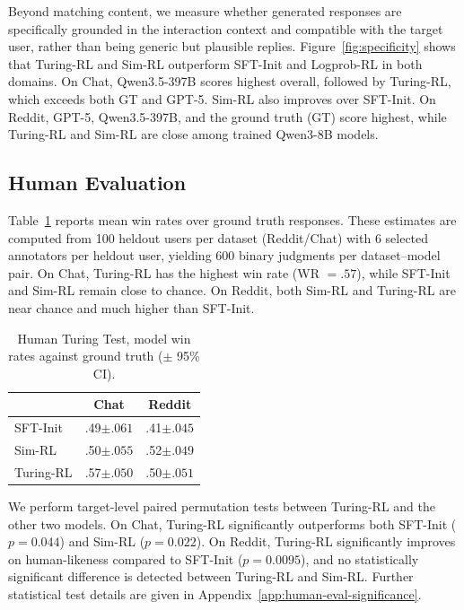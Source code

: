 \documentclass[11pt]{article}
\newcommand{\subtle}[1]{{\tiny\color[gray]{0.4}#1}}
\begin{document}
Beyond matching content, we measure whether generated responses are specifically grounded in the interaction context and compatible with the target user, rather than being generic but plausible replies. Figure~\ref{fig:specificity} shows that Turing-RL and Sim-RL outperform SFT-Init and Logprob-RL in both domains.
On Chat, Qwen3.5-397B scores highest overall, followed by Turing-RL, which exceeds both GT and GPT-5. Sim-RL also improves over SFT-Init. On Reddit, GPT-5, Qwen3.5-397B, and the ground truth (GT) score highest, while Turing-RL and Sim-RL are close among trained Qwen3-8B models. 

\subsection{Human Evaluation}


Table~\ref{tab:human_eval_winrate} reports mean win rates over ground truth responses. These estimates are computed from 100 heldout users per dataset (Reddit/Chat) with 6 selected annotators per heldout user, yielding 600 binary judgments per dataset--model pair.  On Chat, Turing-RL has the highest win rate (WR $= .57$), while SFT-Init and Sim-RL remain close to chance. On Reddit, both Sim-RL and Turing-RL are near chance and much higher than SFT-Init. 

\begin{table}[b]
\centering
\small
\setlength{\tabcolsep}{6pt}
\begin{tabular*}{0.75\columnwidth}{@{\extracolsep{\fill}}lcc@{}}
\toprule
 & \textbf{Chat} & \textbf{Reddit} \\
\midrule
SFT-Init    & .49\subtle{$\pm.061$} & .41\subtle{$\pm.045$} \\
Sim-RL    & .50\subtle{$\pm.055$} & .52\subtle{$\pm.049$} \\
Turing-RL & .57\subtle{$\pm.050$} & {.50\subtle{$\pm.051$}} \\
\bottomrule
\end{tabular*}
\caption{Human Turing Test, model win rates against ground truth ($\pm$ 95\% CI).}
\label{tab:human_eval_winrate}
\end{table}

We perform target-level paired permutation tests between Turing-RL and the other two models. On Chat, Turing-RL significantly outperforms both SFT-Init ($p=0.044$) and Sim-RL ($p=0.022$). On Reddit, Turing-RL significantly improves on human-likeness compared to SFT-Init ($p=0.0095$), and no statistically significant difference is detected between Turing-RL and Sim-RL. Further statistical test details are given in Appendix~\ref{app:human-eval-significance}. 
\end{document}
